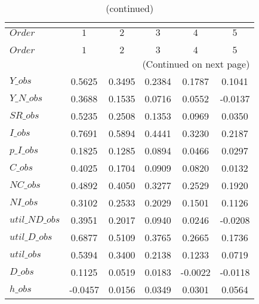  
\begin{center}
\begin{longtable}{lccccc} 
\caption{COEFFICIENTS OF AUTOCORRELATION}\\
 \label{Table:th_autocorr_matrix}\\
\toprule 
$Order          $	 & 	 $         1$	 & 	 $         2$	 & 	 $         3$	 & 	 $         4$	 & 	 $         5$\\
\midrule \endfirsthead 
\caption{(continued)}\\
 \toprule \\ 
$Order          $	 & 	 $         1$	 & 	 $         2$	 & 	 $         3$	 & 	 $         4$	 & 	 $         5$\\
\midrule \endhead 
\midrule \multicolumn{6}{r}{(Continued on next page)} \\ \bottomrule \endfoot 
\bottomrule \endlastfoot 
$Y\_obs         $	 & 	    0.5625	 & 	    0.3495	 & 	    0.2384	 & 	    0.1787	 & 	    0.1041 \\ 
$Y\_N\_obs      $	 & 	    0.3688	 & 	    0.1535	 & 	    0.0716	 & 	    0.0552	 & 	   -0.0137 \\ 
$SR\_obs        $	 & 	    0.5235	 & 	    0.2508	 & 	    0.1353	 & 	    0.0969	 & 	    0.0350 \\ 
$I\_obs         $	 & 	    0.7691	 & 	    0.5894	 & 	    0.4441	 & 	    0.3230	 & 	    0.2187 \\ 
$p\_I\_obs      $	 & 	    0.1825	 & 	    0.1285	 & 	    0.0894	 & 	    0.0466	 & 	    0.0297 \\ 
$C\_obs         $	 & 	    0.4025	 & 	    0.1704	 & 	    0.0909	 & 	    0.0820	 & 	    0.0132 \\ 
$NC\_obs        $	 & 	    0.4892	 & 	    0.4050	 & 	    0.3277	 & 	    0.2529	 & 	    0.1920 \\ 
$NI\_obs        $	 & 	    0.3102	 & 	    0.2533	 & 	    0.2029	 & 	    0.1501	 & 	    0.1126 \\ 
$util\_ND\_obs  $	 & 	    0.3951	 & 	    0.2017	 & 	    0.0940	 & 	    0.0246	 & 	   -0.0208 \\ 
$util\_D\_obs   $	 & 	    0.6877	 & 	    0.5109	 & 	    0.3765	 & 	    0.2665	 & 	    0.1736 \\ 
$util\_obs      $	 & 	    0.5394	 & 	    0.3400	 & 	    0.2138	 & 	    0.1233	 & 	    0.0719 \\ 
$D\_obs         $	 & 	    0.1125	 & 	    0.0519	 & 	    0.0183	 & 	   -0.0022	 & 	   -0.0118 \\ 
$h\_obs         $	 & 	   -0.0457	 & 	    0.0156	 & 	    0.0349	 & 	    0.0301	 & 	    0.0564 \\ 
\end{longtable}
 \end{center}
